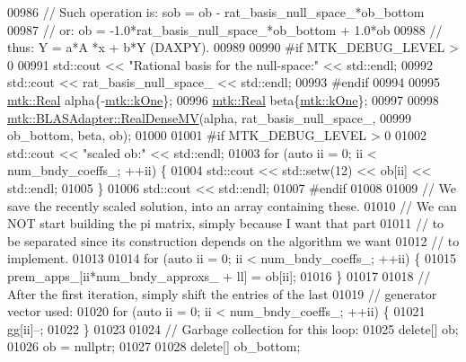 \begin{DoxyCode}
{{00986     \textcolor{comment}{// Such operation is: sob = ob - rat\_basis\_null\_space\_*ob\_bottom}
00987     \textcolor{comment}{// or:                 ob = -1.0*rat\_basis\_null\_space\_*ob\_bottom + 1.0*ob}
00988     \textcolor{comment}{// thus:                Y =    a*A    *x         +   b*Y (DAXPY).}
00989 
00990 \textcolor{preprocessor}{    #if MTK\_DEBUG\_LEVEL > 0}
00991     std::cout << \textcolor{stringliteral}{"Rational basis for the null-space:"} << std::endl;
00992     std::cout << rat\_basis\_null\_space\_ << std::endl;
00993 \textcolor{preprocessor}{    #endif}
00994 
00995     \hyperlink{group__c01-roots_gac080bbbf5cbb5502c9f00405f894857d}{mtk::Real} alpha\{-\hyperlink{group__c01-roots_ga26407c24d43b6b95480943340d285c71}{mtk::kOne}\};
00996     \hyperlink{group__c01-roots_gac080bbbf5cbb5502c9f00405f894857d}{mtk::Real} beta\{\hyperlink{group__c01-roots_ga26407c24d43b6b95480943340d285c71}{mtk::kOne}\};
00997 
00998     \hyperlink{classmtk_1_1BLASAdapter_afdcac059a4294287cb55638221220646}{mtk::BLASAdapter::RealDenseMV}(alpha, rat\_basis\_null\_space\_,
00999                                   ob\_bottom, beta, ob);
01000 
01001 \textcolor{preprocessor}{    #if MTK\_DEBUG\_LEVEL > 0}
01002     std::cout << \textcolor{stringliteral}{"scaled ob:"} << std::endl;
01003     \textcolor{keywordflow}{for} (\textcolor{keyword}{auto} ii = 0; ii < num\_bndy\_coeffs\_; ++ii) \{
01004       std::cout << std::setw(12) << ob[ii] << std::endl;
01005     \}
01006     std::cout << std::endl;
01007 \textcolor{preprocessor}{    #endif}
01008 
01009     \textcolor{comment}{// We save the recently scaled solution, into an array containing these.}
01010     \textcolor{comment}{// We can NOT start building the pi matrix, simply because I want that part}
01011     \textcolor{comment}{// to be separated since its construction depends on the algorithm we want}
01012     \textcolor{comment}{// to implement.}
01013 
01014     \textcolor{keywordflow}{for} (\textcolor{keyword}{auto} ii = 0; ii < num\_bndy\_coeffs\_; ++ii) \{
01015       prem\_apps\_[ii*num\_bndy\_approxs\_ + ll] = ob[ii];
01016     \}
01017 
01018     \textcolor{comment}{// After the first iteration, simply shift the entries of the last}
01019     \textcolor{comment}{// generator vector used:}
01020     \textcolor{keywordflow}{for} (\textcolor{keyword}{auto} ii = 0; ii < num\_bndy\_coeffs\_; ++ii) \{
01021       gg[ii]--;
01022     \}
01023 
01024     \textcolor{comment}{// Garbage collection for this loop:}
01025     \textcolor{keyword}{delete}[] ob;
01026     ob = \textcolor{keyword}{nullptr};
01027 
01028     \textcolor{keyword}{delete}[] ob\_bottom;
}}
\end{DoxyCode}
